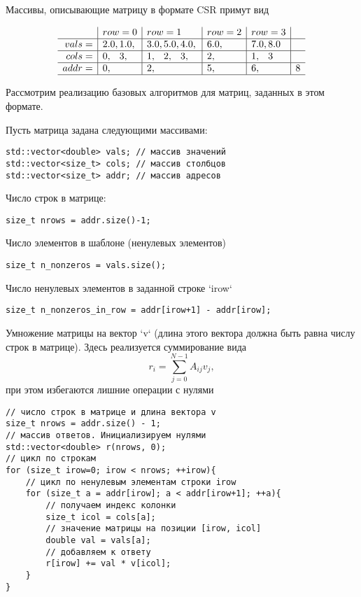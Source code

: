 Массивы, описывающие матрицу в формате CSR примут вид

\begin{equation*}
\begin{array}{r|l|l|l|l|l}
      & row=0     & row=1          & row=2& row=3&\\
\hline
vals= & 2.0, 1.0, & 3.0, 5.0, 4.0, & 6.0, & 7.0, 8.0 &\\
\hline
cols= & 0,\phantom{.0} 3,\phantom{.0}      & 1,\phantom{.0}2,\phantom{.0}3,\phantom{.0}          & 2,\phantom{.0}   & 1,\phantom{.0} 3     &\\
\hline
addr= & 0,        & 2,             & 5,   & 6,       & 8 \\
\hline
\end{array}
\end{equation*}

Рассмотрим реализацию базовых алгоритмов для матриц, заданных в этом формате.

Пусть матрица задана следующими массивами:
\begin{verbatim}
std::vector<double> vals; // массив значений
std::vector<size_t> cols; // массив столбцов
std::vector<size_t> addr; // массив адресов
\end{verbatim}

Число строк в матрице:
\begin{verbatim}
size_t nrows = addr.size()-1;
\end{verbatim}

Число элементов в шаблоне (ненулевых элементов)
\begin{verbatim}
size_t n_nonzeros = vals.size();
\end{verbatim}

Число ненулевых элементов в заданной строке `irow`
\begin{verbatim}
size_t n_nonzeros_in_row = addr[irow+1] - addr[irow];
\end{verbatim}

Умножение матрицы на вектор `v` (длина этого вектора должна быть равна числу строк в матрице).
Здесь реализуется суммирование вида
\begin{equation*}
    r_i = \sum_{j=0}^{N-1} A_{ij} v_j,
\end{equation*}
при этом избегаются лишние операции с нулями
\begin{verbatim}
// число строк в матрице и длина вектора v
size_t nrows = addr.size() - 1;
// массив ответов. Инициализируем нулями
std::vector<double> r(nrows, 0);
// цикл по строкам
for (size_t irow=0; irow < nrows; ++irow){
	// цикл по ненулевым элементам строки irow
	for (size_t a = addr[irow]; a < addr[irow+1]; ++a){
		// получаем индекс колонки
		size_t icol = cols[a];
		// значение матрицы на позиции [irow, icol]
		double val = vals[a];
		// добавляем к ответу
		r[irow] += val * v[icol];
	}
}
\end{verbatim}


